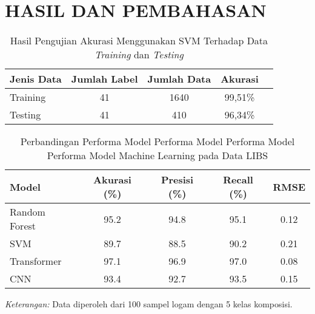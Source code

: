 \chapter{HASIL DAN PEMBAHASAN}


\begin{table}[H]
    \centering
    \caption{Hasil Pengujian Akurasi Menggunakan SVM Terhadap Data \textit{Training} dan \textit{Testing}}
    \label{tb_detail_akurasi_face}
    \begin{tabular}{lcccc}
    \toprule
    \textbf{Jenis Data} & \textbf{Jumlah Label} & \textbf{Jumlah Data} & {\color[HTML]{000000} \textbf{Akurasi}} \\ 
    \midrule
    {\color[HTML]{000000} Training} & {\color[HTML]{000000} 41} & {\color[HTML]{000000} 1640} & {\color[HTML]{000000} 99,51\%} \\ 
    {\color[HTML]{000000} Testing} & {\color[HTML]{000000} 41} & {\color[HTML]{000000} 410} & {\color[HTML]{000000} 96,34\%} \\ 
    \bottomrule
    \end{tabular}
    \end{table}

    \begin{table}[H]
        \centering
        \caption{Perbandingan Performa Model Performa Model Performa Model Performa Model Machine Learning pada Data LIBS}
        \label{tab:performa_ml}
        \centering
        \begin{tabular}{lcccc}
          \toprule
          Model & Akurasi (\%) & Presisi (\%) & Recall (\%) & RMSE \\
          \midrule
          Random Forest & 95.2 & 94.8 & 95.1 & 0.12 \\
          SVM & 89.7 & 88.5 & 90.2 & 0.21 \\
          Transformer & 97.1 & 96.9 & 97.0 & 0.08 \\
          CNN & 93.4 & 92.7 & 93.5 & 0.15 \\
          \bottomrule
        \end{tabular}
        
        \smallskip
        \footnotesize
        \textit{Keterangan:} Data diperoleh dari 100 sampel logam dengan 5 kelas komposisi.
      \end{table}
    

\begin{comment}

\end{comment}